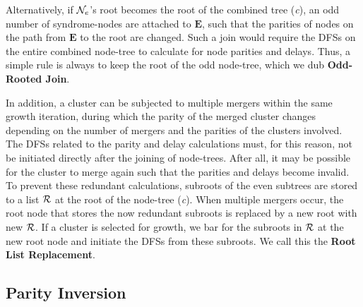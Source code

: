 Alternatively, if $\mathcal{N}_e$'s root becomes the root of the combined tree (\emph{c}), an odd number of syndrome-nodes are attached to $\mathbf{E}$, such that the parities of nodes on the path from $\mathbf{E}$ to the root are changed. Such a join would require the DFSs on the entire combined node-tree to calculate for node parities and delays. Thus, a simple rule is always to keep the root of the odd node-tree, which we dub \textbf{Odd-Rooted Join}.

In addition, a cluster can be subjected to multiple mergers within the same growth iteration, during which the parity of the merged cluster changes depending on the number of mergers and the parities of the clusters involved. The DFSs related to the parity and delay calculations must, for this reason, not be initiated directly after the joining of node-trees. After all, it may be possible for the cluster to merge again such that the parities and delays become invalid. To prevent these redundant calculations, subroots of the even subtrees are stored to a list $\mathcal{R}$ at the root of the node-tree (\emph{c}). When multiple mergers occur, the root node that stores the now redundant subroots is replaced by a new root with new $\mathcal{R}$. If a cluster is selected for growth, we bar for the subroots in $\mathcal{R}$ at the new root node and initiate the DFSs from these subroots. We call this the \textbf{Root List Replacement}. 


\subsection{Parity Inversion}\label{sec:inversion}

